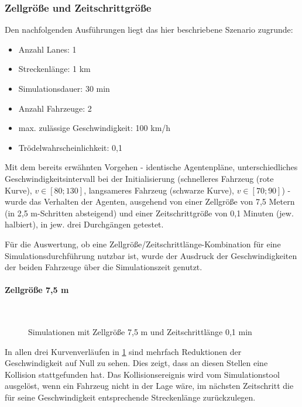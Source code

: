 \subsubsection{Zellgröße und Zeitschrittgröße}
\label{sec:cellsize-timesteplength}

Den nachfolgenden Ausführungen liegt das hier beschriebene Szenario zugrunde:
\begin{itemize}
\itemsep0em
	\item Anzahl Lanes: 1
	\item Streckenlänge: 1 km
	\item Simulationsdauer: 30 min
	\item Anzahl Fahrzeuge: 2
	\item max. zulässige Geschwindigkeit: 100 km/h
	\item Trödelwahrscheinlichkeit: 0,1
\end{itemize}
Mit dem bereits erwähnten Vorgehen - identische Agentenpläne, unterschiedliches Geschwindigkeitsintervall bei der Initialisierung (schnelleres Fahrzeug (rote Kurve), $ v \in [80; 130] $, langsameres Fahrzeug (schwarze Kurve), $ v \in [70; 90] $) - wurde das Verhalten der Agenten, ausgehend von einer Zellgröße von 7,5 Metern (in 2,5 m-Schritten absteigend) und einer Zeitschrittgröße von 0,1 Minuten (jew. halbiert), in jew. drei Durchgängen getestet.

Für die Auswertung, ob eine Zellgröße/Zeitschrittlänge-Kombination für eine Simulationsdurchführung nutzbar ist, wurde der Ausdruck der Geschwindigkeiten der beiden Fahrzeuge über die Simulationszeit genutzt.


\paragraph*{Zellgröße 7,5 m}
\hfill \\
\begin{figure}[hptb]
  \centering 
   \qquad 
   \qquad 
  \caption{Simulationen mit Zellgröße 7,5 m und Zeitschrittlänge 0,1 min} 
  \label{figure:run1-3}
\end{figure}

In allen drei Kurvenverläufen in \cref{figure:run1-3} sind mehrfach Reduktionen der Geschwindigkeit auf Null zu sehen. 
Dies zeigt, dass an diesen Stellen eine Kollision stattgefunden hat. Das Kollisionsereignis wird vom Simulationstool ausgelöst, wenn ein Fahrzeug nicht in der Lage wäre, im nächsten Zeitschritt die für seine Geschwindigkeit entsprechende Streckenlänge zurückzulegen.

